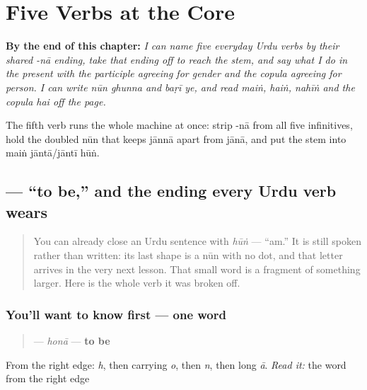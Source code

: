 
\chapter{Five Verbs at the Core}
\label{ch:ur-core-verbs}

\begin{chapteropening}
\textbf{By the end of this chapter:} \emph{I can name five everyday Urdu verbs by their shared -nā ending, take that ending off to reach the stem, and say what I do in the present with the participle agreeing for gender and the copula agreeing for person. I can write nūn ghunna and baṛī ye, and read maiṅ, haiṅ, nahīṅ and the copula hai off the page.}

The fifth verb runs the whole machine at once: strip -nā from all five infinitives, hold the doubled nūn that keeps jānnā apart from jānā, and put the stem into maiṅ jāntā/jāntī hūṅ.
\end{chapteropening}

\section[\texorpdfstring{\ur{ہونا} (honā)}{ہونا (honā)}]{ — “to be,” and the ending every Urdu verb wears}

\label{lesson:UR-C06-hona}



\begin{quote}
You can already close an Urdu sentence with \emph{hūṅ} — “am.” It is still spoken rather than written: its last shape is a nūn with no dot, and that letter arrives in the very next lesson. That small word is a fragment of something larger. Here is the whole verb it was broken off.
\end{quote}

\subsection*{You'll want to know first — one word}
\begin{quote}
\textbf{} — \emph{honā} — \textbf{to be}
\end{quote}

From the right edge: \textbf{} \emph{h}, then \textbf{} carrying \emph{o}, then \textbf{} \emph{n}, then \textbf{} long \emph{ā}. \emph{Read it:} the word from the right edge

